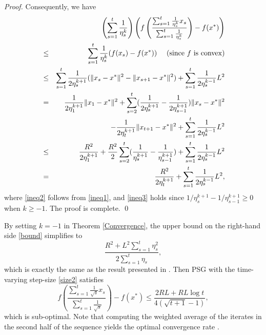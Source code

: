 \begin{proof}
Consequently, we have
	\begin{eqnarray}
&&\left(\sum_{s=1}^t\frac{1}{\eta_s^k}\right)\left(		f\left(\frac{\sum_{s=1}^t \frac{1}{\eta_s^k}x_s}{\sum_{s=1}^t \frac{1}{\eta_s^k}}\right)-f(x^*)\right) \nonumber \\
&\le&	\sum_{s=1}^t\frac{1}{\eta_s^k}(f(x_s)-f(x^*))  ~~~~({\rm since~}f{\rm~is~convex})\nonumber\\
&\le& \sum_{s=1}^t\frac{1}{2\eta_s^{k+1}}(\Vert x_s-x^* \Vert^2-\Vert x_{s+1}-x^* \Vert^2)+\sum_{s=1}^t\frac{1}{2\eta_s^{k-1}}L^2 \label{ineq2}\\
			&=& \frac{1}{2\eta_1^{k+1}}\Vert x_1-x^* \Vert^2+\sum_{s=2}^t(\frac{1}{2\eta_s^{k+1}}-\frac{1}{2\eta_{s-1}^{k+1}})\Vert x_s-x^* \Vert^2 \nonumber\\
&&-\frac{1}{2\eta_{t}^{k+1}}\Vert x_{t+1}-x^* \Vert^2+\sum_{s=1}^t\frac{1}{2\eta_s^{k-1}}L^2\nonumber\\
			&\le& \frac{R^2}{2\eta_1^{k+1}}+\frac{R^2}{2}\sum_{s=2}^t(\frac{1}{\eta_s^{k+1}}-\frac{1}{\eta_{s-1}^{k+1}})+
\sum_{s=1}^t\frac{1}{2\eta_s^{k-1}}L^2\label{ineq3}\\
			&=& \frac{R^2}{2\eta_t^{k+1}}+\sum_{s=1}^t\frac{1}{2\eta_s^{k-1}}L^2,\nonumber
		 \end{eqnarray}
where \eqref{ineq2} follows from \eqref{ineq1}, and \eqref{ineq3} holds since $1/\eta_s^{k+1}-1/\eta_{s-1}^{k+1}\ge0$ when $k\ge -1$. The proof is complete.  \qed
\end{proof}	

\begin{remark}\label{r1}
By setting $k=-1$ in Theorem \ref{Convergence}, the upper bound on the right-hand side \eqref{bound} simplifies to
	\begin{equation*}
\frac{R^2+L^2\sum_{s=1}^t\eta_s^2}{2\sum_{s=1}^t\eta_s},
	\end{equation*}
	which is exactly the same as the result presented in \cite{nesterov2018lectures}. Then PSG with the time-varying step-size \eqref{size2} satisfies
\begin{equation}
	f\left(\frac{\sum_{s=1}^t \frac{1}{ \sqrt{s}}x_s}{\sum_{s=1}^t \frac{1}{\sqrt{s}}}\right)-f(x^*)\le \frac{2RL+RL\log t}{4(\sqrt{t+1}-1)}, \label{bound2}
\end{equation}
which is sub-optimal. Note that computing the weighted average of the iterates in the second half of the sequence yields the optimal convergence rate \cite[Corollary 3.2]{Lan}.
\end{remark}


